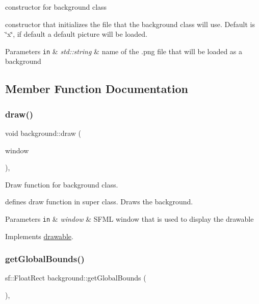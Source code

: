 constructor for background class 

constructor that initializes the file that the background class will use. Default is \char`\"{}x\char`\"{}, if default a default picture will be loaded.


\begin{DoxyParams}[1]{Parameters}
\mbox{\tt in}  & {\em std\+::string} & name of the .png file that will be loaded as a background \\
\hline
\end{DoxyParams}


\subsection{Member Function Documentation}
\mbox{\label{classbackground_a41736f9a00defad1e84b3a8099c887e2}} 
\subsubsection{\texorpdfstring{draw()}{draw()}}
{\footnotesize\ttfamily void background\+::draw (\begin{DoxyParamCaption}\item[{sf\+::\+Render\+Window \&}]{window }\end{DoxyParamCaption})\hspace{0.3cm}{\ttfamily [override]}, {\ttfamily [virtual]}}



Draw function for background class. 

defines draw function in super class. Draws the background.


\begin{DoxyParams}[1]{Parameters}
\mbox{\tt in}  & {\em window} & S\+F\+ML window that is used to display the drawable \\
\hline
\end{DoxyParams}


Implements \hyperlink{classdrawable_a4e49e2c1121704c83ce24c5f48dd910f}{drawable}.

\mbox{\label{classbackground_ab5f2b627cd58e0d07678f0af01c6bd2d}} 
\subsubsection{\texorpdfstring{get\+Global\+Bounds()}{getGlobalBounds()}}
{\footnotesize\ttfamily sf\+::\+Float\+Rect background\+::get\+Global\+Bounds (\begin{DoxyParamCaption}{ }\end{DoxyParamCaption})\hspace{0.3cm}{\ttfamily [override]}, {\ttfamily [virtual]}}



